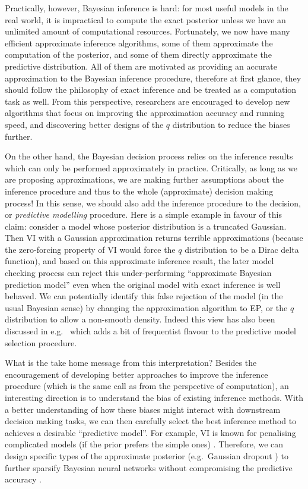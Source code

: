 Practically, however, Bayesian inference is hard: for most useful models in the real world, it is impractical to compute the exact posterior unless we have an unlimited amount of computational resources. Fortunately, we now have many efficient approximate inference algorithms, some of them approximate the computation of the posterior, and some of them directly approximate the predictive distribution. All of them are motivated as providing an accurate approximation to the Bayesian inference procedure, therefore at first glance, they should follow the philosophy of exact inference and be treated as a computation task as well. From this perspective, researchers are encouraged to develop new algorithms that focus on improving the approximation accuracy and running speed, and discovering better designs of the $q$ distribution to reduce the biases further.

On the other hand, the Bayesian decision process relies on the inference results which can only be performed approximately in practice. Critically, as long as we are proposing approximations, we are making further assumptions about the inference procedure and thus to the whole (approximate) decision making process! In this sense, we should also add the inference procedure to the decision, or \emph{predictive modelling} procedure. Here is a simple example in favour of this claim: consider a model whose posterior distribution is a truncated Gaussian. Then VI with a Gaussian approximation returns terrible approximations (because the zero-forcing property of VI would force the $q$ distribution to be a Dirac delta function), and based on this approximate inference result, the later model checking process can reject this under-performing ``approximate Bayesian prediction model'' even when the original model with exact inference is well behaved. We can potentially identify this false rejection of the model (in the usual Bayesian sense) by changing the approximation algorithm to EP, or the $q$ distribution to allow a non-smooth density. Indeed this view has also been discussed in e.g.~\cite{dawid:prequential1984, meng:posterior_pvalue1994, gelman:posterior_predictive1996, gelman:philosophy2013} which adds a bit of frequentist flavour to the predictive model selection procedure. 

What is the take home message from this interpretation? Besides the encouragement of developing better approaches to improve the inference procedure (which is the same call as from the perspective of computation), an interesting direction is to understand the bias of existing inference methods. With a better understanding of how these biases might interact with downstream decision making tasks, we can then carefully select the best inference method to achieves a desirable ``predictive model''.
%
For example, VI is known for penalising complicated models (if the prior prefers the simple ones) \citep{hinton:mdl1993}. Therefore, we can design specific types of the approximate posterior (e.g.~Gaussian dropout \citep{srivastava:dropout2014, kingma:variational_dropout2015}) to further sparsify Bayesian neural networks without compromising the predictive accuracy \citep{molchanov:variational_dropout2017, louizos:bayesian_compression2017}.

